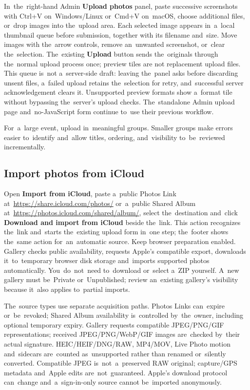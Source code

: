\documentclass[11pt,a4paper]{article}
\newcommand{\ui}[1]{\textbf{#1}}
\begin{document}
In~the~right-hand Admin \ui{Upload photos} panel, paste successive screenshots
with Ctrl+V on~Windows/Linux or~Cmd+V on~macOS, choose additional files, or~drop
images into the~upload area. Each selected image appears in~a~local thumbnail
queue before submission, together with its filename and~size. Move images with
the~arrow controls, remove an~unwanted screenshot, or~clear the~selection.
The~existing \ui{Upload} button sends the~originals through the~normal upload
process once; preview tiles are not replacement upload files. This queue is~not
a~server-side draft: leaving the~panel asks before discarding unsent files,
a~failed upload retains the~selection for retry, and~successful server
acknowledgement clears it. Unsupported preview formats show a~format tile
without bypassing the~server's upload checks. The~standalone Admin upload page
and~no-JavaScript form continue to~use their previous workflow.

For~a~large event, upload in~meaningful groups. Smaller groups make errors
easier to~identify and~allow titles, ordering, and~visibility to~be~reviewed
incrementally.


\subsection{Import photos from iCloud}
Open \ui{Import from iCloud}, paste a~public Photos Link
at~\url{https://share.icloud.com/photos/} or~a~public Shared Album
at~\url{https://photos.icloud.com/shared/album/}, select the~destination
and~click \ui{Download and import from iCloud} beside the~link. This action
recognizes the~link and~starts the~existing upload form in~one step; the~footer
shows the~same action for~an~automatic source. Keep browser preparation enabled.
Gallery checks public availability, requests Apple's compatible export,
downloads it~to~temporary browser disk storage and~imports supported photos
automatically. You~do~not~need to~download or~select a~ZIP yourself. A~new
gallery must be~Private or~Unpublished; review an~existing gallery's visibility
because it~also applies to~partial imports.

The~source types use separate acquisition paths. Photos Links can~expire
or~be~revoked; Shared Album availability is~controlled by~the~owner, including
optional temporary expiry. Gallery requests compatible JPEG/PNG/GIF
representations; received JPEG/PNG/WebP/GIF images are~checked by~their actual
signature. HEIC/HEIF/DNG/RAW, MP4/MOV, Live Photo motion and~sidecars
are~counted as~unsupported rather than renamed or~silently converted. Compatible
JPEG is~not~a~preserved RAW original; capture/GPS metadata and~Apple edits
are~not~guaranteed. Apple's download protocol can~change and~a~sign-in-only
source cannot be~imported anonymously.
\end{document}
